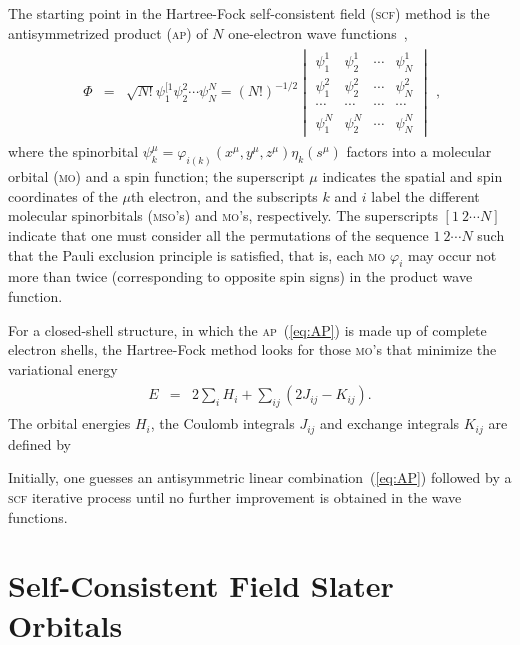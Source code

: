 The starting point in the Hartree-Fock self-consistent field
(\textsc{scf}) method is the antisymmetrized product (\textsc{ap}) of
$N$ one-electron wave functions~\cite{Roothaan_HF},
%
\begin{eqnarray}
  \begin{split}
    \Phi & = & \sqrt{N!}\psi_{1}^{[1} \psi_{2}^{2} \cdots \psi_{N}^{N} =
    (N!)^{-1/2}
    \begin{vmatrix}
      \psi_{1}^{1} & \psi_{2}^{1} & \cdots & \psi_{N}^{1} \\
      \psi_{1}^{2} & \psi_{2}^{2} & \cdots & \psi_{N}^{2} \\
      \cdots & \cdots & \cdots & \cdots \\
      \psi_{1}^{N} & \psi_{2}^{N} & \cdots & \psi_{N}^{N}
    \end{vmatrix}
  \end{split},
  \label{eq:AP}
\end{eqnarray}
%
where the spinorbital $\psi_{k}^{\mu} = \varphi_{i(k)}(x^{\mu},
y^{\mu}, z^{\mu}) \eta_{k}(s^{\mu})$ factors into a molecular orbital
(\textsc{mo}) and a spin function; the superscript $\mu$ indicates the
spatial and spin coordinates of the $\mu$th electron, and the
subscripts $k$ and $i$ label the different molecular spinorbitals
(\textsc{mso}'s) and \textsc{mo}'s, respectively. The superscripts
$[1\ 2 \cdots N]$ indicate that one must consider all the permutations
of the sequence $1\ 2 \cdots N$ such that the Pauli exclusion
principle is satisfied, that is, each \textsc{mo} $\varphi_{i}$ may
occur not more than twice (corresponding to opposite spin signs) in
the product wave function.

For a closed-shell structure, in which the \textsc{ap}~(\ref{eq:AP})
is made up of complete electron shells, the Hartree-Fock method looks
for those \textsc{mo}'s that minimize the variational energy
%
\begin{eqnarray}
  \begin{split}
    E & = & 2\sum\limits_{i} H_{i} + \sum\limits_{ij} (2J_{ij} -
    K_{ij}).
  \end{split}
  \label{eq:HF_energy}
\end{eqnarray}
%
The orbital energies $H_{i}$, the Coulomb integrals $J_{ij}$ and
exchange integrals $K_{ij}$ are defined by

Initially, one guesses an antisymmetric linear
combination~(\ref{eq:AP}) followed by a \textsc{scf} iterative process
until no further improvement is obtained in the wave functions. 





\section{Self-Consistent Field Slater Orbitals}
\label{ch:scf_sto}




